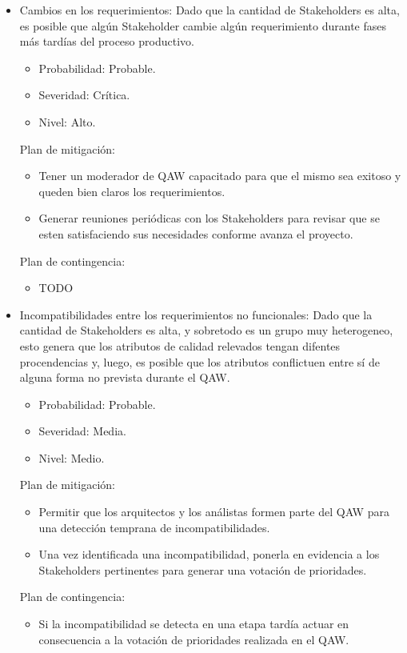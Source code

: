 \begin{itemize}
\bigskip

\item Cambios en los requerimientos: Dado que la cantidad de Stakeholders es alta, es posible que alg\'un Stakeholder cambie alg\'un requerimiento durante fases m\'as tard\'ias del proceso productivo.
\begin{itemize}
\item Probabilidad: Probable.
\item Severidad: Cr\'itica.
\item Nivel: Alto.
\end{itemize}
\medskip
Plan de mitigación:
\begin{itemize}
\item Tener un moderador de QAW capacitado para que el mismo sea exitoso y queden bien claros los requerimientos.
\item Generar reuniones peri\'odicas con los Stakeholders para revisar que se esten satisfaciendo sus necesidades conforme avanza el proyecto.
\end{itemize}
\medskip
Plan de contingencia:
\begin{itemize}
 \item TODO
\end{itemize}

\bigskip

\item Incompatibilidades entre los requerimientos no funcionales: Dado que la cantidad de Stakeholders es alta, y sobretodo es un grupo muy heterogeneo, esto genera que los atributos de calidad relevados tengan difentes procendencias y, luego, es posible que los atributos conflictuen entre s\'i de alguna forma no prevista durante el QAW.
\begin{itemize}
\item Probabilidad: Probable.
\item Severidad: Media.
\item Nivel: Medio.
\end{itemize}
\medskip
Plan de mitigación:
\begin{itemize}
\item Permitir que los arquitectos y los an\'alistas formen parte del QAW para una detecci\'on temprana de incompatibilidades.
\item Una vez identificada una incompatibilidad, ponerla en evidencia a los Stakeholders pertinentes para generar una votaci\'on de prioridades.
\end{itemize}
\medskip
Plan de contingencia:
\begin{itemize}
\item Si la incompatibilidad se detecta en una etapa tard\'ia actuar en consecuencia a la votaci\'on de prioridades realizada en el QAW.
\end{itemize}


\end{itemize}
